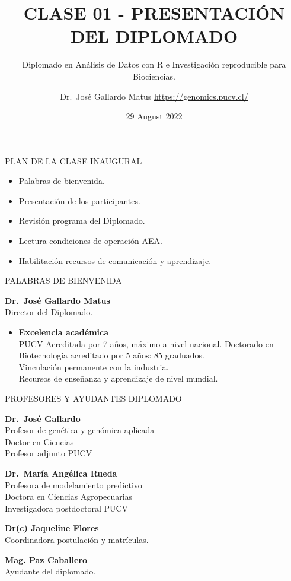 \documentclass[
  ignorenonframetext,
]{beamer}
\title{CLASE 01 - PRESENTACIÓN DEL DIPLOMADO}
\subtitle{Diplomado en Análisis de Datos con R e Investigación reproducible para
Biociencias.}
\author{Dr.~José Gallardo Matus \textbar{} \url{https://genomics.pucv.cl/}}
\date{29 August 2022}
\institute{Pontificia Universidad Católica de Valparaíso}
\providecommand{\tightlist}{%
  \setlength{\itemsep}{0pt}\setlength{\parskip}{0pt}}
\begin{document}
\frame{\titlepage}

\begin{frame}{PLAN DE LA CLASE INAUGURAL}
\protect\hypertarget{plan-de-la-clase-inaugural}{}

\begin{itemize}
\item
  Palabras de bienvenida.
\item
  Presentación de los participantes.
\item
  Revisión programa del Diplomado.
\item
  Lectura condiciones de operación AEA.
\item
  Habilitación recursos de comunicación y aprendizaje.
\end{itemize}

\end{frame}

\begin{frame}{PALABRAS DE BIENVENIDA}
\protect\hypertarget{palabras-de-bienvenida}{}

\textbf{Dr.~José Gallardo Matus}\\
Director del Diplomado.

\begin{itemize}
\tightlist
\item
  \textbf{Excelencia académica}\\
  PUCV Acreditada por 7 años, máximo a nivel nacional. Doctorado en
  Biotecnología acreditado por 5 años: 85 graduados.\\
  Vinculación permanente con la industria.\\
  Recursos de enseñanza y aprendizaje de nivel mundial.
\end{itemize}

\end{frame}

\begin{frame}{PROFESORES Y AYUDANTES DIPLOMADO}
\protect\hypertarget{profesores-y-ayudantes-diplomado}{}

\textbf{Dr.~José Gallardo}\\
Profesor de genética y genómica aplicada\\
Doctor en Ciencias\\
Profesor adjunto PUCV

\textbf{Dr.~María Angélica Rueda}\\
Profesora de modelamiento predictivo\\
Doctora en Ciencias Agropecuarias\\
Investigadora postdoctoral PUCV

\textbf{Dr(c) Jaqueline Flores}\\
Coordinadora postulación y matrículas.

\textbf{Mag. Paz Caballero}\\
Ayudante del diplomado.

\end{frame}
\end{document}
